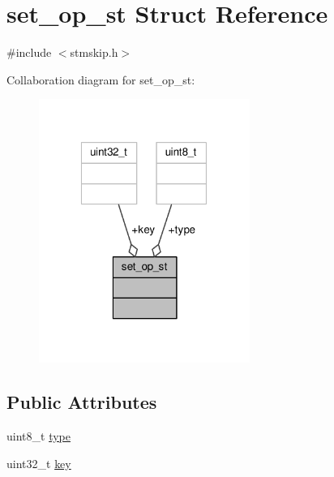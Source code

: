 \hypertarget{structset__op__st}{\section{set\-\_\-op\-\_\-st Struct Reference}
\label{structset__op__st}
}


{\ttfamily \#include $<$stmskip.\-h$>$}



Collaboration diagram for set\-\_\-op\-\_\-st\-:
\nopagebreak
\begin{figure}[H]
\begin{center}
\leavevmode
\includegraphics[width=195pt]{structset__op__st__coll__graph}
\end{center}
\end{figure}
\subsection*{Public Attributes}
\begin{DoxyCompactItemize}
\item 
uint8\-\_\-t \hyperlink{structset__op__st_ae8e9c78593f4322e4abd3dbdc7ca93bc}{type}
\item 
uint32\-\_\-t \hyperlink{structset__op__st_a08e9db35b667c4e179e10dc439896997}{key}
\end{DoxyCompactItemize}


